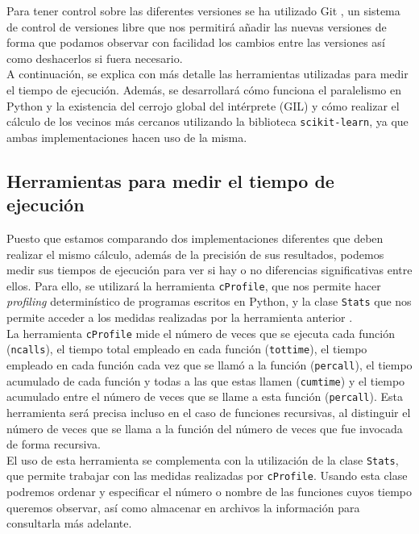 \documentclass[12pt,a4paper]{report} %
\theoremstyle{definition}
\begin{document}
Para tener control sobre las diferentes versiones se ha utilizado Git \cite{git}, un sistema de control de versiones libre que nos permitirá añadir las nuevas versiones de forma que podamos observar con facilidad los cambios entre las versiones así como deshacerlos si fuera necesario.\\

A continuación, se explica con más detalle las herramientas utilizadas para medir el tiempo de ejecución. Además, se desarrollará cómo funciona el paralelismo en Python y la existencia del cerrojo global del intérprete (GIL) y cómo realizar el cálculo de los vecinos más cercanos utilizando la biblioteca \texttt{scikit-learn}, ya que ambas implementaciones hacen uso de la misma.\\

\subsection{Herramientas para medir el tiempo de ejecución}

Puesto que estamos comparando dos implementaciones diferentes que deben realizar el mismo cálculo, además de la precisión de sus resultados, podemos medir sus tiempos de ejecución para ver si hay o no diferencias significativas entre ellos. Para ello, se utilizará la herramienta \texttt{cProfile}, que nos permite hacer \textit{profiling} determinístico de programas escritos en Python, y la clase \texttt{Stats} que nos permite acceder a los medidas realizadas por la herramienta anterior \cite{profilers}.\\

La herramienta \texttt{cProfile} mide el número de veces que se ejecuta cada función (\texttt{ncalls}), el tiempo total empleado en cada función (\texttt{tottime}), el tiempo empleado en cada función cada vez que se llamó a la función (\texttt{percall}), el tiempo acumulado de cada función y todas a las que estas llamen (\texttt{cumtime}) y el tiempo acumulado entre el número de veces que se llame a esta función (\texttt{percall}). Esta herramienta será precisa incluso en el caso de funciones recursivas, al distinguir el número de veces que se llama a la función del número de veces que fue invocada de forma recursiva.\\

El uso de esta herramienta se complementa con la utilización de la clase \texttt{Stats}, que permite trabajar con las medidas realizadas por \texttt{cProfile}. Usando esta clase podremos ordenar y especificar el número o nombre de las funciones cuyos tiempo queremos observar, así como almacenar en archivos la información para consultarla más adelante.\\
\end{document}
